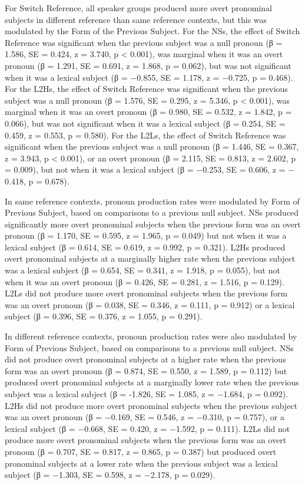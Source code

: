 \documentclass[output=paper,colorlinks,citecolor=brown,draftmode]{langscibook}
\begin{document}
For Switch Reference, all speaker groups produced more overt pronominal subjects in different reference than same reference contexts, but this was modulated by the Form of the Previous Subject. For the NSs, the effect of Switch Reference was significant when the previous subject was a null pronoun (β = 1.586, SE = 0.424, z = 3.740, p < 0.001), was marginal when it was an overt pronoun (β = 1.291, SE = 0.691, z = 1.868, p = 0.062), but was not significant when it was a lexical subject (β = $-$0.855, SE = 1.178, z = $-$0.725, p = 0.468). For the L2Hs, the effect of Switch Reference was significant when the previous subject was a null pronoun (β = 1.576, SE = 0.295, z = 5.346, p < 0.001), was marginal when it was an overt pronoun (β = 0.980, SE = 0.532, z = 1.842, p = 0.066), but was not significant when it was a lexical subject (β = 0.254, SE = 0.459, z = 0.553, p = 0.580). For the L2Ls, the effect of Switch Reference was significant when the previous subject was a null pronoun (β = 1.446, SE = 0.367, z = 3.943, p < 0.001), or an overt pronoun (β = 2.115, SE = 0.813, z = 2.602, p = 0.009), but not when it was a lexical subject (β = $-$0.253, SE = 0.606, z = $-$0.418, p = 0.678).

\hspace*{-2.4pt}In same reference contexts, pronoun production rates were modulated by Form of Previous Subject, based on comparisons to a previous null subject. NSs produced significantly more overt pronominal subjects when the previous form was an overt pronoun (β = 1.170, SE = 0.595, z = 1.965, p = 0.049) but not when it was a lexical subject (β = 0.614, SE = 0.619, z = 0.992, p = 0.321). L2Hs produced overt pronominal subjects at a marginally higher rate when the previous subject was a lexical subject (β = 0.654, SE = 0.341, z = 1.918, p = 0.055), but not when it was an overt pronoun (β = 0.426, SE = 0.281, z = 1.516, p = 0.129). L2Ls did not produce more overt pronominal subjects when the previous form was an overt pronoun (β = 0.038, SE = 0.346, z = 0.111, p = 0.912) or a lexical subject (β = 0.396, SE = 0.376, z = 1.055, p = 0.291).

In different reference contexts, pronoun production rates were also modulated by Form of Previous Subject, based on comparisons to a previous null subject. NSs did not produce overt pronominal subjects at a higher rate when the previous form was an overt pronoun (β = 0.874, SE = 0.550, z = 1.589, p = 0.112) but produced overt pronominal subjects at a marginally lower rate when the previous subject was a lexical subject (β = -1.826, SE = 1.085, z = $-$1.684, p = 0.092). L2Hs did not produce more overt pronominal subjects when the previous subject was an overt pronoun (β = $-$0.169, SE = 0.546, z = $-$0.310, p = 0.757), or a lexical subject (β = $-$0.668, SE = 0.420, z = $-$1.592, p = 0.111). L2Ls did not produce more overt pronominal subjects when the previous form was an overt pronoun (β = 0.707, SE = 0.817, z = 0.865, p = 0.387) but produced overt pronominal subjects at a lower rate when the previous subject was a lexical subject (β = $-$1.303, SE = 0.598, z = $-$2.178, p = 0.029).
\end{document}
